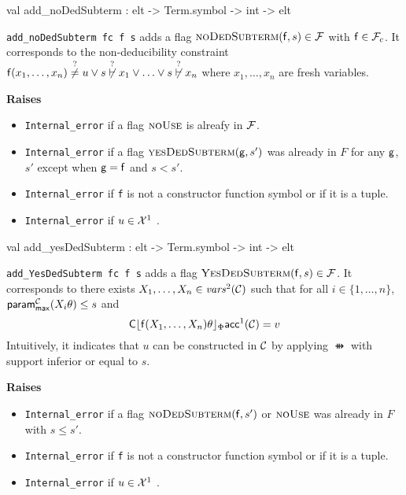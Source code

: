 \begin{ocamldocsigend}
\label{val:Constraint.Frame.add-underscorenoDedSubterm}\begin{ocamldoccode}
val add_noDedSubterm : elt -> Term.symbol -> int -> elt
\end{ocamldoccode}
\begin{ocamldocdescription}
{\tt{add\_noDedSubterm fc f s}} adds a flag $\textsc{noDedSubterm}(\mathsf{f},s) \in \mathcal{F}$ with $\mathsf{f} \in \mathcal{F}_c$.
      It corresponds to the non-deducibility constraint $\mathsf{f}(x_1,\ldots, x_n) \stackrel{?}{\neq} u \vee s \not\stackrel{?}{\vdash}
      x_1 \vee \ldots \vee s \not\stackrel{?}{\vdash} x_n$ where $x_1, \ldots, x_n$ are fresh variables. 

{\bf Raises} \begin{itemize}
\item {\tt{Internal\_error}} if a flag $\textsc{noUse}$ is alreafy in $\mathcal{F}$. \lowdebug 
\item {\tt{Internal\_error}} if a flag $\textsc{yesDedSubterm}(\mathsf{g},s')$ was already in $F$ for any $\mathsf{g}$, $s'$ except when $\mathsf{g} = \mathsf{f}$ and $s < s'$.
\item {\tt{Internal\_error}} if {\tt{f}} is not a constructor function symbol or if it is a tuple. \lowdebug 
\item {\tt{Internal\_error}} if $u \in \mathcal{X}^1$ \lowdebug .
\end{itemize}



\end{ocamldocdescription}


\label{val:Constraint.Frame.add-underscoreyesDedSubterm}\begin{ocamldoccode}
val add_yesDedSubterm : elt -> Term.symbol -> int -> elt
\end{ocamldoccode}
\begin{ocamldocdescription}
{\tt{add\_YesDedSubterm fc f s}} adds a flag $\textsc{YesDedSubterm}(\mathsf{f},s) \in \mathcal{F}$. It corresponds to there exists $X_1, \ldots, X_n \in \mathit{vars}^2(\mathcal{C})$
      such that for all $i \in \{1, \ldots, n\}$, $\mathsf{param^{\mathcal{C}}_{max}}(X_i\theta) \leq s$ and 
      \[
      {\mathsf{C}\lfloor\mathsf{f}(X_1,\ldots,X_n)\theta\rfloor_{\Phi}}\mathsf{acc}^1(\mathcal{C}) = v
      \]
      Intuitively, it indicates that $u$ can be constructed in $\mathcal{C}$ by applying $\ffun$ with support inferior or equal to $s$. 

{\bf Raises} \begin{itemize}
\item {\tt{Internal\_error}} if a flag $\textsc{noDedSubterm}(\mathsf{f},s')$ or $\textsc{noUse}$ was already in $F$ with $s \leq s'$. \lowdebug 
\item {\tt{Internal\_error}} if {\tt{f}} is not a constructor function symbol or if it is a tuple. \lowdebug 
\item {\tt{Internal\_error}} if $u \in \mathcal{X}^1$ \lowdebug .
\end{itemize}




\end{ocamldocdescription}
\end{ocamldocsigend}
